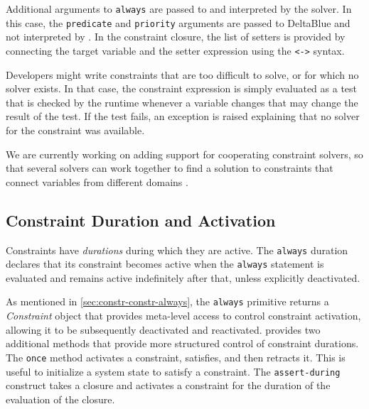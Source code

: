 Additional arguments to \lstinline{always} are passed to and
interpreted by the solver. In this case, the \lstinline{predicate} and
\lstinline{priority} arguments are passed to DeltaBlue and not
interpreted by \langname. In the constraint closure, the list of
setters is provided by connecting the target variable and the setter
expression using the \lstinline{<->} syntax.

Developers might write constraints that are too difficult to solve, or
for which no solver exists. In that case, the constraint expression is
simply evaluated as a test that is checked by the runtime whenever a
variable changes that may change the result of the test. If the test
fails, an exception is raised explaining that no solver for the
constraint was available.

We are currently working on adding support for cooperating constraint
solvers, so that several solvers can work together to find a solution
to constraints that connect variables from different domains
\cite{borning-coop-solvers-2012}.

\subsection{Constraint Duration and Activation}
\label{sec:constraint-durations-and-activation}
Constraints have \emph{durations} during which they are active.  
The \lstinline{always} duration declares
that its constraint becomes active when the \lstinline{always}
statement is evaluated and remains active indefinitely after that,
unless explicitly deactivated.

As mentioned in \autoref{sec:constr-constr-always}, the
\lstinline{always} primitive returns a \emph{Constraint} object that
provides meta-level access to control constraint activation,
allowing it to be subsequently deactivated and reactivated.  \langname
provides two additional methods that provide more structured
control of constraint durations.
The \lstinline{once} method activates a constraint,
satisfies, and then retracts it. This is useful to initialize a system
state to satisfy a constraint. The \lstinline{assert-during} construct
takes a closure and activates a constraint for the duration of the
evaluation of the closure.

